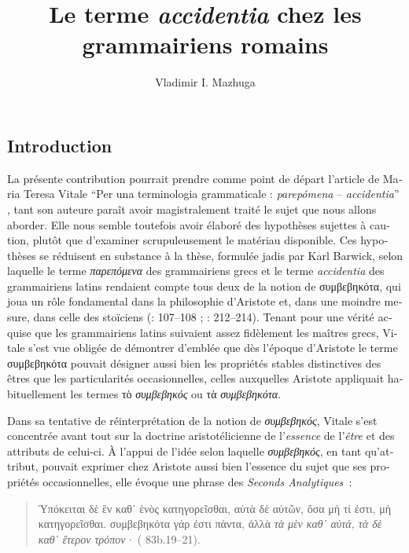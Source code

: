 \documentclass[output=paper]{langsci/langscibook}
\title{Le terme \textit{accidentia} chez les grammairiens romains}
\author{Vladimir I. Mazhuga\affiliation{Saint Petersburg Institute of History, RAS}}
\begin{document}
\begin{otherlanguage}{french}
\maketitle

\section{Introduction} 
La présente contribution pourrait prendre comme point de départ l’article de Maria Teresa Vitale “Per una terminologia grammaticale : \textit{parepómena} – \textit{accidentia}” \citep{vitale_per_1982}, tant son auteure paraît avoir magistralement traité le sujet que nous allons aborder. Elle nous semble toutefois avoir élaboré des hypothèses sujettes à caution, plutôt que d’examiner scrupuleusement le matériau disponible. Ces hypothèses se réduisent en substance à la thèse, formulée jadis par Karl Barwick, selon laquelle le terme \textit{παρεπόμενα} des grammairiens grecs et le terme \textit{accidentia} des grammairiens latins rendaient compte tous deux de la notion de συμβεβηκότα, qui joua un rôle fondamental dans la philosophie d’Aristote et, dans une moindre mesure, dans celle des stoïciens (\citealt{barwick_remmius_1922}: 107--108 ; \citealt{vitale_per_1982}: 212–214). Tenant pour une vérité acquise que les grammairiens latins suivaient assez fidèlement les maîtres grecs, Vitale s’est vue obligée de démontrer d’emblée que dès l’époque d’Aristote le terme συμβεβηκότα pouvait désigner aussi bien les propriétés stables distinctives des êtres que les particularités occasionnelles, celles auxquelles Aristote appliquait habituellement les termes τὸ \textit{συμβεβηκός} ou τὰ \textit{συμβεβηκότα}. 

Dans sa tentative de réinterprétation de la notion de \textit{συμβεβηκός}, Vitale s’est concentrée avant tout sur la doctrine aristotélicienne de l’\textit{essence} de l’\textit{être} et des attributs de celui-ci. À l’appui de l’idée selon laquelle \textit{συμβεβηκός}, en tant qu’attribut, pouvait exprimer chez Aristote aussi bien l’essence du sujet que ses propriétés occasionnelles, elle évoque une phrase des \textit{Seconds Analytiques~}:

\begin{quote}
    Ὑπόκειται δὲ ἓν καθ᾿ ἑνὸς κατηγορεῖσθαι, αὐτὰ δὲ αὐτῶν, ὅσα μὴ τί ἐστι, μὴ κατηγορεῖσθαι. συμβεβηκότα γάρ ἐστι πάντα, ἀλλὰ \textit{τὰ μὲν καθ᾿ αὑτά, τὰ δὲ καθ᾿ ἕτερον τρόπον·} ( 83b.19–21).


\end{quote}
\end{otherlanguage}
\end{document}
